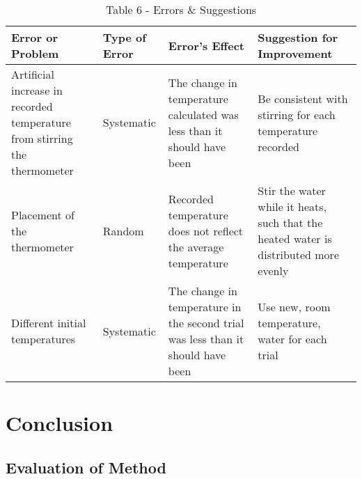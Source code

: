 \documentclass{lab}
\begin{document}
	\noindent\begin{minipage}{\textwidth}
        \vspace{-0.2cm}
	\renewcommand{\arraystretch}{1.1}
        \begin{table}[H]
            \centering
            \begin{tabular}{L{1.445in}|L{1.445in}|L{1.445in}|L{1.445in}}
            \toprule
            \textbf{Error or Problem}    & \textbf{Type of Error}    & \textbf{Error's Effect}    & \textbf{Suggestion for Improvement}\\
            \hline
            Artificial increase in recorded temperature from stirring the thermometer & Systematic & The change in temperature calculated was less than it should have been & Be consistent with stirring for each temperature recorded \\
            \hline
            Placement of the thermometer & Random & Recorded temperature does not reflect the average temperature & Stir the water while it heats, such that the heated water is distributed more evenly \\
            \hline
            Different initial temperatures & Systematic & The change in temperature in the second trial was less than it should have been & Use new, room temperature, water for each trial \\
            \bottomrule
        \end{tabular}
	\caption{Table 6 - Errors \& Suggestions}
	    \label{table: errors}
	\end{table}
	\end{minipage}

	\section*{Conclusion}

	\subsection*{Evaluation of Method}
\end{document}
